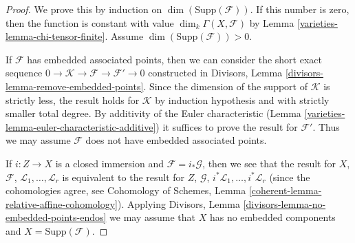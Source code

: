 \begin{proof}

We prove this by induction on $\dim(\text{Supp}(\mathcal{F}))$.
If this number is zero, then the function is constant with value
$\dim_k \Gamma(X, \mathcal{F})$ by Lemma \ref{varieties-lemma-chi-tensor-finite}.
Assume $\dim(\text{Supp}(\mathcal{F})) > 0$.

\medskip\noindent
If $\mathcal{F}$ has embedded associated points, then we can consider
the short exact sequence
$0 \to \mathcal{K} \to \mathcal{F} \to \mathcal{F}' \to 0$
constructed in Divisors, Lemma \ref{divisors-lemma-remove-embedded-points}.
Since the dimension of the support of $\mathcal{K}$ is strictly less,
the result holds for $\mathcal{K}$ by induction hypothesis and with
strictly smaller total degree.
By additivity of the Euler characteristic
(Lemma \ref{varieties-lemma-euler-characteristic-additive})
it suffices to prove the result for $\mathcal{F}'$. Thus we may assume
$\mathcal{F}$ does not have embedded associated points.

\medskip\noindent
If $i : Z \to X$ is a closed immersion and $\mathcal{F} = i_*\mathcal{G}$,
then we see that the result for $X$, $\mathcal{F}$,
$\mathcal{L}_1, \ldots, \mathcal{L}_r$ is equivalent to the result
for $Z$, $\mathcal{G}$, $i^*\mathcal{L}_1, \ldots, i^*\mathcal{L}_r$
(since the cohomologies agree, see
Cohomology of Schemes, Lemma \ref{coherent-lemma-relative-affine-cohomology}).
Applying Divisors, Lemma \ref{divisors-lemma-no-embedded-points-endos}
we may assume that $X$ has no embedded components and
$X = \text{Supp}(\mathcal{F})$.


\end{proof}
